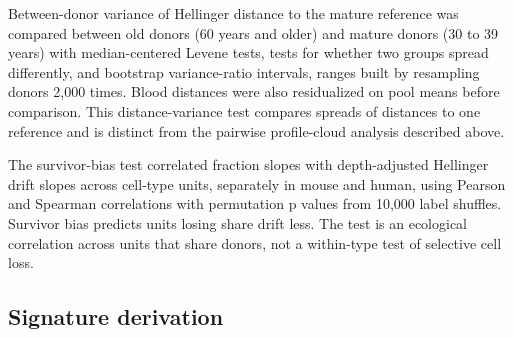 \documentclass[11pt]{article}
\begin{document}
Between-donor variance of Hellinger distance to the mature reference was compared between old donors (60 years and older) and mature donors (30 to 39 years) with median-centered Levene tests, tests for whether two groups spread differently, and bootstrap variance-ratio intervals, ranges built by resampling donors 2,000 times. Blood distances were also residualized on pool means before comparison. This distance-variance test compares spreads of distances to one reference and is distinct from the pairwise profile-cloud analysis described above.

The survivor-bias test correlated fraction slopes with depth-adjusted Hellinger drift slopes across cell-type units, separately in mouse and human, using Pearson and Spearman correlations with permutation p values from 10,000 label shuffles. Survivor bias predicts units losing share drift less. The test is an ecological correlation across units that share donors, not a within-type test of selective cell loss.

\subsection*{Signature derivation}
\end{document}
